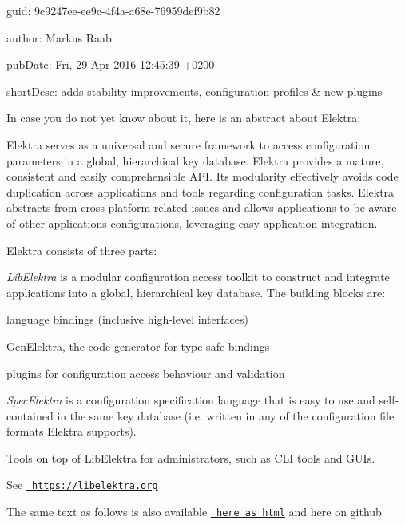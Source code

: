 
\begin{DoxyItemize}
\item guid\+: 9c9247ee-\/ee9c-\/4f4a-\/a68e-\/76959def9b82
\item author\+: Markus Raab
\item pub\+Date\+: Fri, 29 Apr 2016 12\+:45\+:39 +0200
\item short\+Desc\+: adds stability improvements, configuration profiles \& new plugins
\end{DoxyItemize}

In case you do not yet know about it, here is an abstract about Elektra\+:

Elektra serves as a universal and secure framework to access configuration parameters in a global, hierarchical key database. Elektra provides a mature, consistent and easily comprehensible A\+PI. Its modularity effectively avoids code duplication across applications and tools regarding configuration tasks. Elektra abstracts from cross-\/platform-\/related issues and allows applications to be aware of other applications\textquotesingle{} configurations, leveraging easy application integration.

Elektra consists of three parts\+:


\begin{DoxyEnumerate}
\item {\itshape Lib\+Elektra} is a modular configuration access toolkit to construct and integrate applications into a global, hierarchical key database. The building blocks are\+:
\begin{DoxyItemize}
\item language bindings (inclusive high-\/level interfaces)
\item Gen\+Elektra, the code generator for type-\/safe bindings
\item plugins for configuration access behaviour and validation
\end{DoxyItemize}
\item {\itshape Spec\+Elektra} is a configuration specification language that is easy to use and self-\/contained in the same key database (i.\+e. written in any of the configuration file formats Elektra supports).
\item Tools on top of Lib\+Elektra for administrators, such as C\+LI tools and G\+U\+Is.
\end{DoxyEnumerate}

See \href{https://libelektra.org}{\texttt{ https\+://libelektra.\+org}}

The same text as follows is also available \href{https://doc.libelektra.org/news/9c9247ee-ee9c-4f4a-a68e-76959def9b82.html}{\texttt{ here as html}} and here on github


